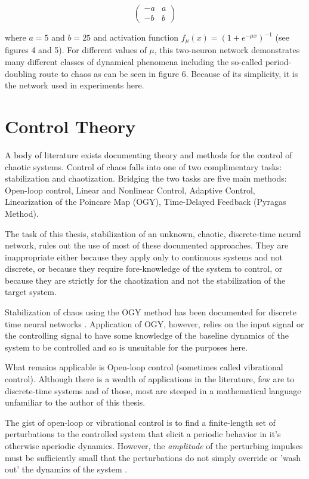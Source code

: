 \documentclass[12pt]{article}
\begin{document}
\[ \left( \begin{array}{cc}
        -a & a \\
        -b & b \end{array} \right)\]

where $a=5$ and $b=25$ and activation
function $f_{\mu}(x) = (1 + e^{-\mu x})^{-1}$ (see figures 4 and 5).  
For different values of $\mu$,
this two-neuron network demonstrates many
different classes of dynamical phenomena including the so-called
period-doubling route to chaos as can be seen in figure 6.  Because of its
simplicity, it is the network used in experiments here.

\section{Control Theory}
A body of literature exists documenting theory and methods for the control
of chaotic systems.  Control of chaos falls into one of two complimentary
tasks:  stabilization and chaotization\cite{control_review}.
Bridging the two tasks are five main methods:  Open-loop control, Linear and
Nonlinear Control, Adaptive Control, Linearization of the Poincare Map (OGY),
Time-Delayed Feedback (Pyragas Method)\cite{control_review}.

The task of this thesis, stabilization of an unknown, chaotic, discrete-time 
neural network, rules
out the use of most of these documented approaches.  They are inappropriate
either because they apply only to continuous systems and not discrete, or
because they require fore-knowledge of the system to control, or because
they are strictly for the chaotization and not the stabilization of the
target system.

Stabilization of chaos using the OGY method has been documented
for discrete time neural networks \cite{yu}.
Application of OGY, however, relies on
the input signal or the controlling signal to have some knowledge of the
baseline dynamics of the system to be controlled and so is unsuitable for
the purposes here.

What remains applicable is Open-loop control (sometimes called vibrational
control).  Although there is a wealth of applications in the literature,
few are to discrete-time systems and of those, most are steeped in a
mathematical language unfamiliar to the author of this thesis.

The gist of open-loop or vibrational control is to find a finite-length set of
perturbations to the controlled system that elicit a periodic behavior in
it's otherwise aperiodic dynamics.  However, the \textit{amplitude} of the
perturbing impulses must be sufficiently small that the perturbations do
not simply override or 'wash out' the dynamics
of the system \cite{control_review}.
\end{document}
